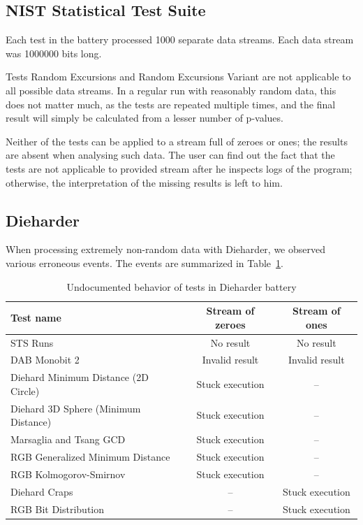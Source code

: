 \documentclass[
	digital,    %
	oneside,    %
	color,
	11pt,
	nocover,
	notable,
	nolof,
	nolot,
]{fithesis3}
\theoremstyle{definition}
\theoremstyle{remark}
\begin{document}
\subsection*{NIST Statistical Test Suite}
Each test in the battery processed 1000 separate data streams. Each data stream was 1000000 bits long.

Tests Random Excursions and Random Excursions Variant are not applicable to all possible data streams. In a regular run with reasonably random data, this does not matter much, as the tests are repeated multiple times, and the final result will simply be calculated from a lesser number of p-values. 

Neither of the tests can be applied to a stream full of zeroes or ones; the results are absent when analysing such data. The user can find out the fact that the tests are not applicable to provided stream after he inspects logs of the program; otherwise, the interpretation of the missing results is left to him.

\subsection*{Dieharder}
When processing extremely non-random data with Dieharder, we observed various erroneous events. The events are summarized in Table~\ref{tab:dieharder_errors}. 

\begin{table}[h!]
\begin{nomar}
\centering
\begin{tabular}{@{}lcc@{}} \toprule
\textbf{Test name}                   & \textbf{Stream of zeroes} & \textbf{Stream of ones} \\ \midrule
STS Runs                             & No result                & No result                \\
DAB Monobit 2 						 & Invalid result           & Invalid result           \\
Diehard Minimum Distance (2D Circle) & Stuck execution          & --                        \\
Diehard 3D Sphere (Minimum Distance) & Stuck execution          & --                        \\
Marsaglia and Tsang GCD              & Stuck execution          & --                        \\
RGB Generalized Minimum Distance     & Stuck execution          & --                        \\
RGB Kolmogorov-Smirnov               & Stuck execution          & --                        \\  
Diehard Craps                        & --                       & Stuck execution          \\
RGB Bit Distribution                 & --                       & Stuck execution          \\ \bottomrule
\end{tabular}
\end{nomar}
\caption{Undocumented behavior of tests in Dieharder battery}
\label{tab:dieharder_errors}
\end{table}
\end{document}
